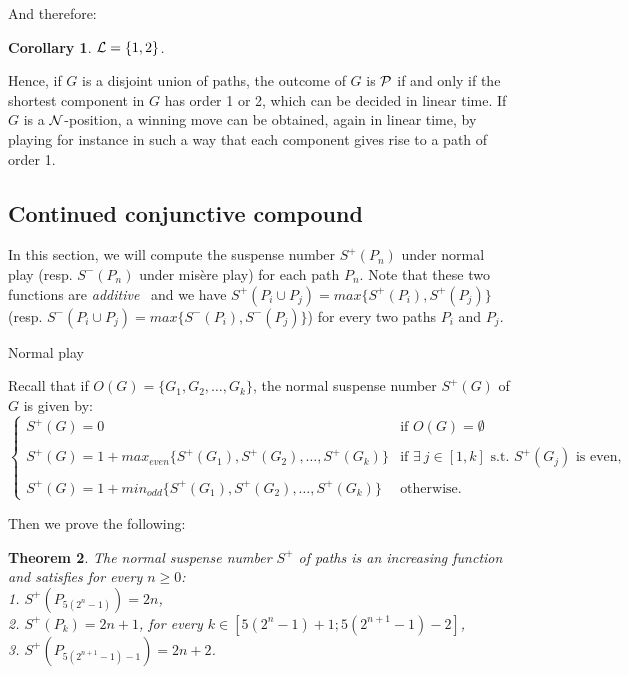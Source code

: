 \documentclass[11pt]{article}
\newcommand{\centre}[1]{\begin{center}#1\end{center}}
\newcommand{\NN}{{\cal N}}
\newcommand{\PP}{{\cal P}}
\newcommand{\LL}{{\cal L}}
\newtheorem{theorem}{Theorem}
\newtheorem{corollary}[theorem]{Corollary}
\begin{document}
And therefore:

\begin{corollary}
$\LL=\{1,2\}$.
\end{corollary}

Hence, if $G$ is a disjoint union of paths, the outcome
of $G$ is $\PP$ if and only if the shortest component in $G$
has order 1 or 2, which can be decided in linear time. 
If $G$ is a $\NN$-position, a winning
move can be obtained, again in linear time, by playing for instance in
such a way that each component gives rise to a path of order 1.

\subsection{Continued conjunctive compound}

In this section, we will compute the suspense number 
$S^+(P_n)$ under normal play (resp. $S^-(P_n)$ under mis\`ere play)
for each path $P_n$.
Note that these two functions are {\em additive}~\cite[p.~177]{ONAG}
and we have $S^+(P_i\cup P_j)=max\{S^+(P_i),S^+(P_j)\}$
(resp. $S^-(P_i\cup P_j)=max\{S^-(P_i),S^-(P_j)\}$) for every
two paths $P_i$ and $P_j$.

\vskip 4mm

\centre{{\sc Normal play}}

\noindent
Recall that if $O(G)=\{G_1,G_2,\dots,G_k\}$, the normal suspense number $S^+(G)$
of $G$ is given by:
$$\left\{
\begin{array}{ll}
 S^+(G)=0 & \mbox{if\ } O(G)=\emptyset \\
 \\
 S^+(G)=1+max_{even}\{S^+(G_1),S^+(G_2),\dots,S^+(G_k)\} &
    \mbox{if $\exists\ j\in[1,k]$ s.t. $S^+(G_j)$ is even,}\\
    \\
 S^+(G)=1+min_{odd}\{S^+(G_1),S^+(G_2),\dots,S^+(G_k)\} &
   \mbox{otherwise.}
\end{array}
\right.$$

Then we prove the following:

\begin{theorem}
The normal suspense number $S^+$ of paths is an increasing
function and satisfies for every $n\ge 0$:\\
1.  $S^+(P_{5(2^n-1)})=2n$,\\
2.  $S^+(P_k)=2n+1$, for every $k\in [5(2^n-1)+1;5(2^{n+1}-1)-2]$,\\
3.  $S^+(P_{5(2^{n+1}-1)-1})=2n+2$.
\label{th:normal_suspense}
\end{theorem}
\end{document}
